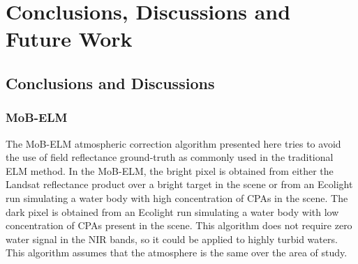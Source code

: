 \chapter{Conclusions, Discussions and Future Work}
\section{Conclusions and Discussions}




\subsection{MoB-ELM}
The MoB-ELM atmospheric correction algorithm presented here tries to avoid the use of field reflectance ground-truth as commonly used in the traditional ELM method. In the MoB-ELM, the bright pixel is obtained from either the Landsat reflectance product over a bright target in the scene or from an Ecolight run simulating a water body with high concentration of CPAs in the scene. The dark pixel is obtained from an Ecolight run simulating a water body with low concentration of CPAs present in the scene. This algorithm does not require zero water signal in the NIR bands, so it could be applied to highly turbid waters. This algorithm assumes that the atmosphere is the same over the area of study.

\label{sec:conc}  %


